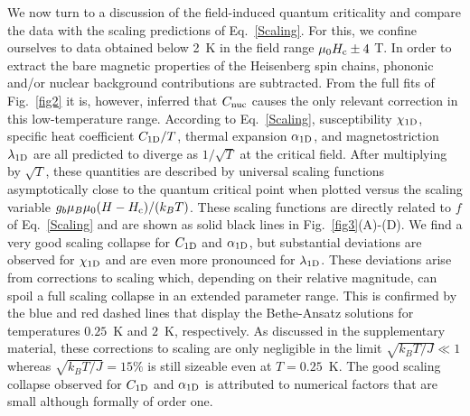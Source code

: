 \documentclass[12pt]{article}
\begin{document}
We now turn to a discussion of the field-induced quantum criticality and compare the data with the scaling predictions of Eq.~\eqref{Scaling}. For this, we confine ourselves to data obtained below 2~K in the field range $\mu_0 H_{\rm c} \pm 4$ T. In order to extract the bare magnetic properties of the Heisenberg spin chains, phononic and/or nuclear background contributions are subtracted. From the full fits of Fig.~\ref{fig2} it is, however, inferred that $C_{\rm nuc}$ causes the only relevant correction in this low-temperature range. According to Eq.~\eqref{Scaling}, susceptibility $\chi_{\rm 1D}$, specific heat coefficient $C_{\rm 1D}/T$, thermal expansion  $\alpha_{\rm 1D}$, and magnetostriction $\lambda_{\rm 1D}$ are all predicted to diverge as $1/\sqrt{T}$ at the critical field. After multiplying by $\sqrt{T}$, these quantities are described  by universal scaling functions asymptotically close to the quantum critical point when plotted versus the scaling variable $g_b \mu_B \mu_0 (H-H_{\rm c})/(k_B T)$. These scaling functions are directly related to $f$ of Eq.~\eqref{Scaling} and are shown as solid black lines in Fig.~\ref{fig3}(A)-(D). We find a very good scaling collapse for $C_{\rm 1D}$ and $\alpha_{\rm 1D}$, but substantial deviations are observed for $\chi_{\rm 1D}$ and are even more pronounced for $\lambda_{\rm 1D}$. 
These deviations arise from corrections to scaling which, depending on their relative magnitude, can spoil a full scaling collapse in an extended parameter range. This is confirmed by the blue and red dashed lines that display the Bethe-Ansatz solutions for temperatures $0.25$~K and $2$~K, respectively. As discussed in the supplementary material, these corrections to scaling are only negligible in the limit $\sqrt{k_B T/J} \ll 1$ whereas $\sqrt{k_B T/J} = 15\%$ is still sizeable even at $T = 0.25$~K. The good scaling collapse observed for $C_{\rm 1D}$ and $\alpha_{\rm 1D}$ is attributed to numerical factors that are small although formally of order one.
\end{document}
